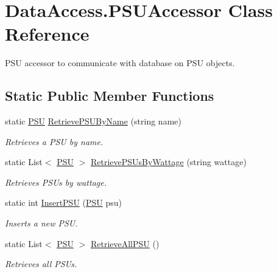 \hypertarget{class_data_access_1_1_p_s_u_accessor}{}\section{Data\+Access.\+P\+S\+U\+Accessor Class Reference}
\label{class_data_access_1_1_p_s_u_accessor}


P\+SU accessor to communicate with database on P\+SU objects.  


\subsection*{Static Public Member Functions}
\begin{DoxyCompactItemize}
\item 
static \hyperlink{class_business_objects_1_1_p_s_u}{P\+SU} \hyperlink{class_data_access_1_1_p_s_u_accessor_a18a99912fcddb6255d3b36d74cdb4e57}{Retrieve\+P\+S\+U\+By\+Name} (string name)
\begin{DoxyCompactList}\small\item\em Retrieves a P\+SU by name. \end{DoxyCompactList}\item 
static List$<$ \hyperlink{class_business_objects_1_1_p_s_u}{P\+SU} $>$ \hyperlink{class_data_access_1_1_p_s_u_accessor_a83eb22b79d6bd8ab03b2bcf0ce8fe5ea}{Retrieve\+P\+S\+Us\+By\+Wattage} (string wattage)
\begin{DoxyCompactList}\small\item\em Retrieves P\+S\+Us by wattage. \end{DoxyCompactList}\item 
static int \hyperlink{class_data_access_1_1_p_s_u_accessor_a3285bd4b20ff99e005ef98f496f8d2dd}{Insert\+P\+SU} (\hyperlink{class_business_objects_1_1_p_s_u}{P\+SU} psu)
\begin{DoxyCompactList}\small\item\em Inserts a new P\+SU. \end{DoxyCompactList}\item 
static List$<$ \hyperlink{class_business_objects_1_1_p_s_u}{P\+SU} $>$ \hyperlink{class_data_access_1_1_p_s_u_accessor_a6f1192a9cf546dab42dab3d31c7c27e8}{Retrieve\+All\+P\+SU} ()
\begin{DoxyCompactList}\small\item\em Retrieves all P\+S\+Us. \end{DoxyCompactList}\end{DoxyCompactItemize}


